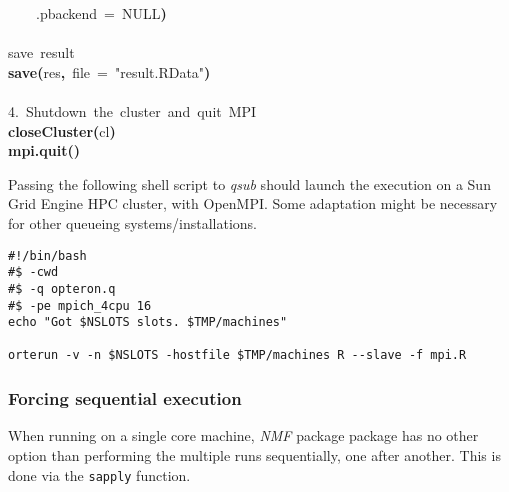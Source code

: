 \documentclass[a4paper]{article}\usepackage{graphicx, color}
\makeatletter
\newcommand{\hlfunctioncall}[1]{\textcolor[rgb]{0.501960784313725,0,0.329411764705882}{\textbf{#1}}}%
\newcommand{\hlstring}[1]{\textcolor[rgb]{0.6,0.6,1}{#1}}%
\newcommand{\hlkeyword}[1]{\textcolor[rgb]{0,0,0}{\textbf{#1}}}%
\newcommand{\hlargument}[1]{\textcolor[rgb]{0.690196078431373,0.250980392156863,0.0196078431372549}{#1}}%
\newcommand{\hlcomment}[1]{\textcolor[rgb]{0.180392156862745,0.6,0.341176470588235}{#1}}%
\newcommand{\hlsymbol}[1]{\textcolor[rgb]{0,0,0}{#1}}%
\newcommand{\hlstd}[1]{\textcolor[rgb]{0,0,0}{#1}}%
\newenvironment{kframe}{%
 \def\FrameCommand##1{\hskip\@totalleftmargin \hskip-\fboxsep
 \colorbox{shadecolor}{##1}\hskip-\fboxsep
     \hskip-\linewidth \hskip-\@totalleftmargin \hskip\columnwidth}%
 \MakeFramed {\advance\hsize-\width
   \@totalleftmargin\z@ \linewidth\hsize
   \@setminipage}}%
 {\par\unskip\endMakeFramed}
\newenvironment{knitrout}{}{} %
\let\code=\texttt
\newcommand{\pkgname}[1]{\textit{#1}\xspace}
\newcommand{\Rpkg}[1]{\pkgname{#1} package\xspace}
\newcommand{\nmfpack}{\Rpkg{NMF}}
\makeatother
\begin{document}
\begin{knitrout}
\begin{kframe}
\begin{flushleft}
\hlstd{}{\ }{\ }{\ }{\ }\hlargument{.pbackend}{\ }\hlargument{=}{\ }NULL\hlkeyword{)}\hspace*{\fill}\\
\hlstd{}\hspace*{\fill}\\
\hlstd{}\hlcomment{\usebox{\hlnormalsizeboxhash}{\ }save{\ }result}\hspace*{\fill}\\
\hlstd{}\hlfunctioncall{save}\hlkeyword{(}\hlsymbol{res}\hlkeyword{,}{\ }\hlargument{file}{\ }\hlargument{=}{\ }\hlstring{"{}result.RData"{}}\hlkeyword{)}\hspace*{\fill}\\
\hlstd{}\hspace*{\fill}\\
\hlstd{}\hlcomment{\usebox{\hlnormalsizeboxhash}\usebox{\hlnormalsizeboxhash}{\ }4.{\ }Shutdown{\ }the{\ }cluster{\ }and{\ }quit{\ }MPI}\hspace*{\fill}\\
\hlstd{}\hlfunctioncall{closeCluster}\hlkeyword{(}\hlsymbol{cl}\hlkeyword{)}\hspace*{\fill}\\
\hlstd{}\hlfunctioncall{mpi.quit}\hlkeyword{(}\hlkeyword{)}\mbox{}
\normalfont
\end{flushleft}
\end{kframe}
\end{knitrout}


Passing the following shell script to \emph{qsub} should launch the execution on a Sun Grid Engine HPC cluster, with OpenMPI.
Some adaptation might be necessary for other queueing systems/installations.

\begin{shaded}
\small
\begin{verbatim}
#!/bin/bash
#$ -cwd 
#$ -q opteron.q
#$ -pe mpich_4cpu 16
echo "Got $NSLOTS slots. $TMP/machines"

orterun -v -n $NSLOTS -hostfile $TMP/machines R --slave -f mpi.R
\end{verbatim}
\end{shaded}

\subsubsection{Forcing sequential execution}
When running on a single core machine, \nmfpack package has no other option than performing the multiple runs sequentially, one after another. 
This is done via the \code{sapply} function.
\end{document}
